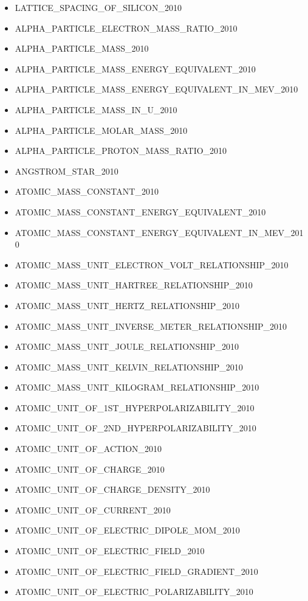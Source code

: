 \begin{itemize}
\item LATTICE\_SPACING\_OF\_SILICON\_2010
\item ALPHA\_PARTICLE\_ELECTRON\_MASS\_RATIO\_2010
\item ALPHA\_PARTICLE\_MASS\_2010
\item ALPHA\_PARTICLE\_MASS\_ENERGY\_EQUIVALENT\_2010
\item ALPHA\_PARTICLE\_MASS\_ENERGY\_EQUIVALENT\_IN\_MEV\_2010
\item ALPHA\_PARTICLE\_MASS\_IN\_U\_2010
\item ALPHA\_PARTICLE\_MOLAR\_MASS\_2010
\item ALPHA\_PARTICLE\_PROTON\_MASS\_RATIO\_2010
\item ANGSTROM\_STAR\_2010
\item ATOMIC\_MASS\_CONSTANT\_2010
\item ATOMIC\_MASS\_CONSTANT\_ENERGY\_EQUIVALENT\_2010
\item ATOMIC\_MASS\_CONSTANT\_ENERGY\_EQUIVALENT\_IN\_MEV\_2010
\item ATOMIC\_MASS\_UNIT\_ELECTRON\_VOLT\_RELATIONSHIP\_2010
\item ATOMIC\_MASS\_UNIT\_HARTREE\_RELATIONSHIP\_2010
\item ATOMIC\_MASS\_UNIT\_HERTZ\_RELATIONSHIP\_2010
\item ATOMIC\_MASS\_UNIT\_INVERSE\_METER\_RELATIONSHIP\_2010
\item ATOMIC\_MASS\_UNIT\_JOULE\_RELATIONSHIP\_2010
\item ATOMIC\_MASS\_UNIT\_KELVIN\_RELATIONSHIP\_2010
\item ATOMIC\_MASS\_UNIT\_KILOGRAM\_RELATIONSHIP\_2010
\item ATOMIC\_UNIT\_OF\_1ST\_HYPERPOLARIZABILITY\_2010
\item ATOMIC\_UNIT\_OF\_2ND\_HYPERPOLARIZABILITY\_2010
\item ATOMIC\_UNIT\_OF\_ACTION\_2010
\item ATOMIC\_UNIT\_OF\_CHARGE\_2010
\item ATOMIC\_UNIT\_OF\_CHARGE\_DENSITY\_2010
\item ATOMIC\_UNIT\_OF\_CURRENT\_2010
\item ATOMIC\_UNIT\_OF\_ELECTRIC\_DIPOLE\_MOM\_2010
\item ATOMIC\_UNIT\_OF\_ELECTRIC\_FIELD\_2010
\item ATOMIC\_UNIT\_OF\_ELECTRIC\_FIELD\_GRADIENT\_2010
\item ATOMIC\_UNIT\_OF\_ELECTRIC\_POLARIZABILITY\_2010

\end{itemize}
